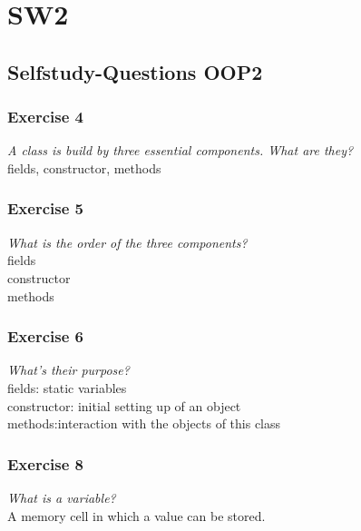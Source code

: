 



\section{SW2}
\subsection{Selfstudy-Questions OOP2}
\subsubsection*{Exercise 4}
\textit{A class is build by three essential components. What are they?}\\
fields, constructor, methods

\subsubsection*{Exercise 5}
\textit{What is the order of the three components?}\\
fields \\
constructor \\
methods

\subsubsection*{Exercise 6}
\textit{What's their purpose?}\\
fields: static variables \\
constructor: initial setting up of an object \\
methods:interaction with the objects of this class

\subsubsection*{Exercise 8}
\textit{What is a variable?}\\
A memory cell in which a value can be stored. 

